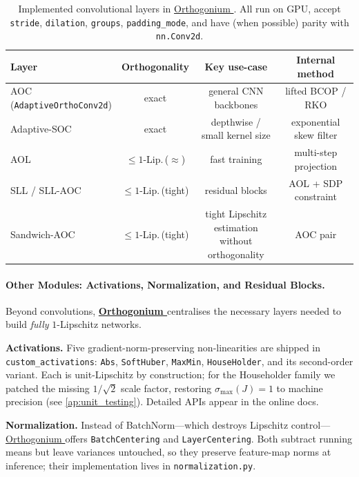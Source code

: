 \documentclass[10pt]{article}
\theoremstyle{plain}
\theoremstyle{definition}
\theoremstyle{remark}
\newcommand{\Orthogonium}{ \href{https://github.com/deel-ai/orthogonium/}{Orthogonium }}
\begin{document}
    \begin{table}[ht]
        \centering
    \caption{Implemented convolutional layers in \Orthogonium.  All run on
    GPU, accept \texttt{stride}, \texttt{dilation}, \texttt{groups},
    \texttt{padding\_mode}, and have (when possible) parity with \texttt{nn.Conv2d}.}
    \label{tab:conv_summary}
    \small
    \begin{tabular}{lccc}
    \toprule
    Layer & Orthogonality & Key use-case & Internal method\\
    \midrule
    \makecell[l]{AOC\\(\texttt{AdaptiveOrthoConv2d})} & exact & general CNN backbones & lifted BCOP / RKO\\
    Adaptive-SOC & exact & \makecell[c]{depthwise /\\small kernel size} & exponential skew filter\\
    AOL & $\le1$-Lip.\,($\approx$) & fast training & multi-step projection\\
    SLL / SLL-AOC & $\le1$-Lip.\,(tight) & residual blocks & AOL + SDP constraint\\
    Sandwich-AOC & $\le1$-Lip.\,(tight) & \makecell[c]{tight Lipschitz estimation\\without orthogonality} & AOC pair\\
    \bottomrule
    \end{tabular}
    \end{table}


\paragraph{Other Modules: Activations, Normalization, and Residual Blocks.}
Beyond convolutions, \textbf{\Orthogonium} centralises the necessary layers needed to build \emph{fully} $1$-Lipschitz networks.

\textbf{Activations.}  
Five gradient-norm-preserving non-linearities are shipped in \texttt{custom\_activations}: \texttt{Abs}, \texttt{SoftHuber}, \texttt{MaxMin}, \texttt{HouseHolder}, and its second-order variant.  Each is unit-Lipschitz by construction; for the Householder family we patched the missing $1/\!\sqrt{2}$ scale factor, restoring $\sigma_{\max}(J)=1$ to machine precision (see \cref{ap:unit_testing}).  Detailed APIs appear in the online docs.

\textbf{Normalization.}  
Instead of BatchNorm—which destroys Lipschitz control—\Orthogonium offers \texttt{BatchCentering} and \texttt{LayerCentering}.  
Both subtract running means but leave variances untouched, so they preserve feature-map norms at inference; their implementation lives in \texttt{normalization.py}.
\end{document}
